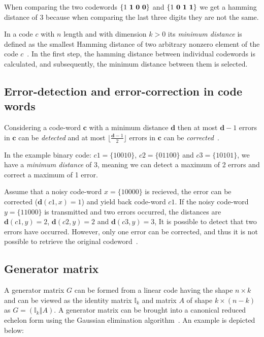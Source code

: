 \documentclass[11pt,
  oneside,openany,    %
]{scrreprt}
\newcommand{\floor}[1]{\lfloor {#1} \rfloor}
\begin{document}
When comparing the two codewords $\{ 1 \ \bold{1} \ \bold{0} \ \bold{0}\}$ and $\{ 1 \ \bold{0} \ \bold{1} \ \bold{1}\}$ we get a hamming distance of 3 because when comparing the last three digits they are not the same.

In a code $c$ with $n$ length and with dimension $k > 0$ its \emph{minimum distance} is defined as the smallest Hamming distance of two arbitrary nonzero element of the code $c$~\cite{bernsteinLange}. In the first step, the hamming distance between individual codewords is calculated, and subsequently, the minimum distance between them is selected.

\subsection{Error-detection and error-correction in code words}

Considering a code-word $\boldsymbol{c}$ with a minimum distance $\boldsymbol{d}$ then at most $\boldsymbol{d} - 1$ errors in $\boldsymbol{c}$ can be \textit{detected} and at most $\floor{\frac{\boldsymbol{d} - 1}{2}}$ errors in $\boldsymbol{c}$ can be \textit{corrected}~\cite{AbstractAlgebraRobinson}.

In the example binary code: $c1 = \{10010\}$, $c2 = \{01100\}$ and $c3 = \{10101\}$, we have a \textit{minimum distance} of 3, meaning we can detect a maximum of 2 errors and correct a maximum of 1 error.

Assume that a noisy code-word $x = \{10000\}$ is recieved, the error can be corrected ($\boldsymbol{d}(c1, x) = 1$) and yield back code-word $c1$. If the noisy code-word $y = \{11000\}$ is transmitted and two errors occurred, the distances are $\boldsymbol{d}(c1, y) = 2$, $\boldsymbol{d}(c2, y) = 2$ and $\boldsymbol{d}(c3, y) = 3$,
It is possible to detect that two errors have occurred. However, only one error can be corrected, and thus it is not possible to retrieve the original codeword~\cite{AbstractAlgebraRobinson}.

\subsection{Generator matrix}
A generator matrix $G$ can be formed from a linear code having the shape $n \times k$ and can be viewed as the identity matrix $\mathbb{I}_{k}$ and matrix $A$ of shape $k \times (n - k)$ as $G = (\mathbb{I}_{k} \mathbin\Vert A)$. A generator matrix can be brought into a canonical reduced echelon form using the Gaussian elimination algorithm~\cite{mathefuerInfoBand1}. An example is depicted below:
\end{document}
